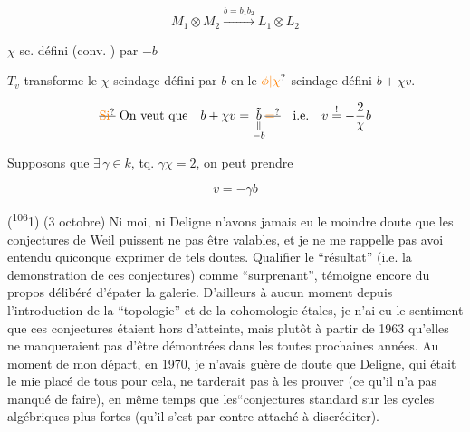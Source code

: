 \[
 M_1\otimes M_2\xrightarrow{b=b_1b_2}L_1\otimes L_2
\]

$\chi$ sc. défini (conv. ) par $-b$

$T_v$   transforme le $\chi$-scindage défini par $b$ en le $\unsure{\phi|\chi}$-scindage défini  $b+\chi v$.

\[
 \deleted{\unsure{\text{Si}}}\ \text{On veut que}\quad b+\chi v=\underset{\substack{\Vert\\-b}}{\tilde b}\deleted{\unsure{=}}
 \quad\text{i.e.}\quad v\overset{!}{=}-\frac2{\chi}b
\]

Supposons que $\exists\,\gamma\in k$, tq. $\gamma\chi=2$, on peut prendre \deleted{\unsure{$\xi$}}

\[
 \boxed{v=-\gamma b}
\]



(\textsuperscript{106}1) (3 octobre) Ni moi, ni Deligne n'avons jamais eu le moindre doute que les conjectures de Weil puissent ne pas être valables, et je ne me rappelle pas avoi entendu quiconque exprimer de tels doutes. Qualifier le ``résultat'' (i.e. la demonstration de ces conjectures) comme ``surprenant'', témoigne encore du propos délibéré d'épater la galerie. D'ailleurs à aucun moment depuis l'introduction de la ``topologie'' et de la cohomologie étales, je n'ai eu le sentiment que ces conjectures étaient hors d'atteinte, mais plutôt \handwritten{(}à partir de 1963\handwritten{)} qu'elles ne manqueraient pas d'être démontrées dans les toutes prochaines années. Au moment de mon départ, en 1970, je n'avais guère de doute que Deligne, qui était le mie placé de tous pour cela, ne tarderait pas à les prouver (ce qu'il n'a pas manqué de faire), en même temps que les``conjectures standard sur les cycles algébriques plus fortes (qu'il s'est par contre attaché à discréditer).

